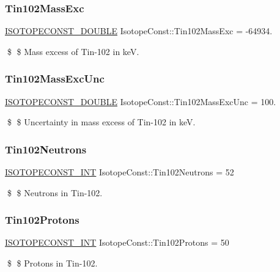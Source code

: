 \subsubsection{\texorpdfstring{Tin102\+Mass\+Exc}{Tin102MassExc}}
{\footnotesize\ttfamily \mbox{\hyperlink{group___isotope_const-_macros_ga8f45a7272ce02c0b4c65c44636ed719a}{I\+S\+O\+T\+O\+P\+E\+C\+O\+N\+S\+T\+\_\+\+D\+O\+U\+B\+LE}} Isotope\+Const\+::\+Tin102\+Mass\+Exc = -\/64934.}

\$ \$ Mass excess of Tin-\/102 in keV. \mbox{\label{group___isotope_const-_tin-_sn102_ga4688c224e4351e6cef0f6b2652240ef0}} 
\subsubsection{\texorpdfstring{Tin102\+Mass\+Exc\+Unc}{Tin102MassExcUnc}}
{\footnotesize\ttfamily \mbox{\hyperlink{group___isotope_const-_macros_ga8f45a7272ce02c0b4c65c44636ed719a}{I\+S\+O\+T\+O\+P\+E\+C\+O\+N\+S\+T\+\_\+\+D\+O\+U\+B\+LE}} Isotope\+Const\+::\+Tin102\+Mass\+Exc\+Unc = 100.}

\$ \$ Uncertainty in mass excess of Tin-\/102 in keV. \mbox{\label{group___isotope_const-_tin-_sn102_ga17743d2d6cc5d22e856a84c072b148c5}} 
\subsubsection{\texorpdfstring{Tin102\+Neutrons}{Tin102Neutrons}}
{\footnotesize\ttfamily \mbox{\hyperlink{group___isotope_const-_macros_ga5f18360b3e99483a35c32d789e62621c}{I\+S\+O\+T\+O\+P\+E\+C\+O\+N\+S\+T\+\_\+\+I\+NT}} Isotope\+Const\+::\+Tin102\+Neutrons = 52}

\$ \$ Neutrons in Tin-\/102. \mbox{\label{group___isotope_const-_tin-_sn102_gaec9ac76965c958c61eb760e944653a3f}} 
\subsubsection{\texorpdfstring{Tin102\+Protons}{Tin102Protons}}
{\footnotesize\ttfamily \mbox{\hyperlink{group___isotope_const-_macros_ga5f18360b3e99483a35c32d789e62621c}{I\+S\+O\+T\+O\+P\+E\+C\+O\+N\+S\+T\+\_\+\+I\+NT}} Isotope\+Const\+::\+Tin102\+Protons = 50}

\$ \$ Protons in Tin-\/102. 